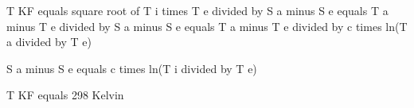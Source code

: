 T KF equals square root of T i times T e divided by S a minus S e equals T a minus T e divided by S a minus S e equals T a minus T e divided by c times ln(T a divided by T e)  

S a minus S e equals c times ln(T i divided by T e)  

T KF equals 298 Kelvin
